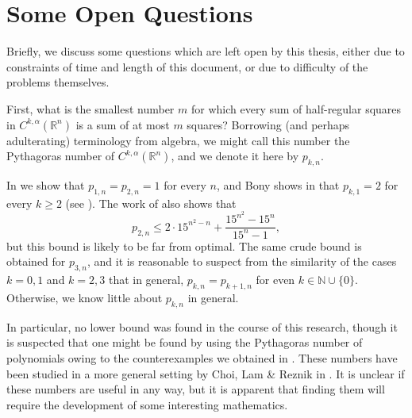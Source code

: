 \documentclass[oneside,hidelinks,indentfirst,10pt]{book}
\begin{document}



\section{Some Open Questions}\label{sec:applics}


Briefly, we discuss some questions which are left open by this thesis, either due to constraints of time and length of this document, or due to difficulty of the problems themselves.


First, what is the smallest number \(m\) for which every sum of half-regular squares in \(C^{k,\alpha}(\mathbb{R}^n)\) is a sum of at most \(m\) squares? Borrowing (and perhaps adulterating) terminology from algebra, we might call this number the Pythagoras number of \(C^{k,\alpha}(\mathbb{R}^n)\), and we denote it here by \(p_{k,n}\). 

In  we show that \(p_{1,n}=p_{2,n}=1\) for every \(n\), and Bony shows in \cite{Bony} that \(p_{k,1}=2\) for every \(k\geq 2\) (see ). The work of  also shows that
\[
    p_{2,n}\leq 2\cdot15^{n^2-n}+\frac{15^{n^2}-15^n}{15^n-1},
\]
but this bound is likely to be far from optimal. The same crude bound is obtained for \(p_{3,n}\), and it is reasonable to suspect from the similarity of the cases \(k=0,1\) and \(k=2,3\) that in general, \(p_{k,n}=p_{k+1,n}\) for even \(k\in\mathbb{N}\cup\{0\}\). Otherwise, we know little about \(p_{k,n}\) in general. 

In particular, no lower bound was found in the course of this research, though it is suspected that one might be found by using the Pythagoras number of polynomials owing to the counterexamples we obtained in . These numbers have been studied in a more general setting by Choi, Lam \& Reznik in \cite{CLR}. It is unclear if these numbers are useful in any way, but it is apparent that finding them will require the development of some interesting mathematics.
\end{document}
